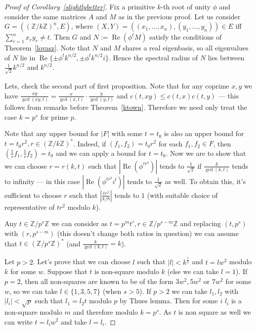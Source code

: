 \documentclass[8pt]{article}
\DeclareMathOperator{\Rre}{\operatorname{Re}}
\begin{document}
\begin{proof}[Proof of Corollary~\ref{slightlybetter}]
Fix a primitive $k$-th root of unity $\phi$ and consider the same matrices $A$ and $M$ as in the previous proof. 
Let us consider $G=((\mathbb{Z}/k\mathbb{Z})^n,E)$, where  $(X,Y)=((x_1,\dots,x_n), (y_1, \dots, y_n))\in E$ iff $\sum_{ r=1}^n x_ry_r\neq t$.
Then $G$ and $N := \Rre (\phi^t M)$ satisfy the conditions of Theorem~\ref{lovasz}.
Note that $N$ and $M$ shares a real eigenbasis, so all eigenvalues of $N$ lie in $\Rre \{ \pm \phi^t k^{n/2}, \pm \phi^t k^{n/2}i \}$. 
Hence the spectral radius of $N$ lies between $\frac{1}{\sqrt{2}} k^{n/2}$ and $k^{n/2}$. 

Lets, check the second part of first proposition. Note that for any coprime  $x,y$ we have $\frac{xy}{\gcd (xy,t)}=\frac{x}{\gcd (x,t)}\cdot \frac{y}{\gcd (y,t)}$ and $c(t,xy)\leq c(t,x)c(t,y)$ --- this follows from remarks before Theorem~\ref{ktown}. Therefore we need only treat the case $k=p^s$ for prime $p$.

Note that any upper bound for $|F|$ with some $t=t_0$ is also an upper bound for $t=t_0r^2, r\in (\mathbb{Z}/k\mathbb{Z})^*$. Indeed, if $(f_1,f_2)=t_0r^2$ for each $f_1,f_2\in F$, then $(\frac{1}{r}f_1, \frac{1}{r}f_2)=t_0$ and we can apply a bound for $t=t_0$. Now we are to show that we can choose $r=r(k,t)$ such that $|\Rre (\phi^{tr^2})|$ tends to $\frac{1}{\sqrt{2}}$ if $\frac{k}{\gcd (k,t)}$ tends to infinity --- in this case $|\Rre (\phi^{tr^2}i^l)|$ tends to $\frac{1}{\sqrt{2}}$ as well. 
To obtain this, it's sufficient to choose $r$ such that $|\frac{tr^2}{k/8}|$ tends to $1$ (with suitable choice of  representative of $tr^2$ modulo $k$).  


Any $t\in \mathbb{Z}/p^s \mathbb{Z}$ we can consider as $t=p^mt', r\in\mathbb{Z}/p^{s-m}\mathbb{Z}$ and replacing $(t,p^s)$ with $(r, p^{s-m})$ (this doesn't change both ratios in question) we can assume that $t\in (\mathbb{Z}/p^s \mathbb{Z})^*$ (and $\frac{k}{\gcd (k,t)}=k$).


Let $p>2$. Let's prove that we can choose $l$ such that $|l|<k^{\frac{1}{2}}$ and $t=lw^2$ modulo $k$ for some $w$. Suppose that $t$ is non-square modulo $k$ (else we can take $l=1$). If $p=2$, then all non-squares are known to be of the form
$3w^2,5w^2$ or $7w^2$ for some $w$, so we can take $l\in\{1,3,5,7\}$ (when $s>5$). If $p>2$ we can take $l_1,l_2$ with $|l_i|<\sqrt{p}$ such that $l_1=l_2t$ modulo $p$ by Thues lemma. Then for some $i$ $l_i$ is a non-square modulo $m$ and therefore modulo $k=p^s$. As $t$ is non square as well we can write $t=l_iw^2$ and take $l=l_i$.


\end{proof}
\end{document}
